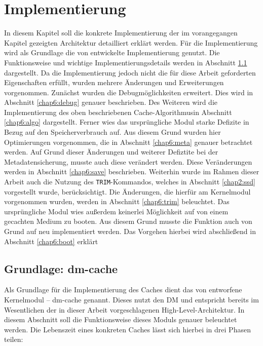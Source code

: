 \chapter{Implementierung}
\label{chap6}

In diesem Kapitel soll die konkrete Implementierung der im vorangegangen Kapitel gezeigten Architektur detailliert erklärt werden. Für die Implementierung wird
als Grundlage die von \textcite{dm-cache} entwickelte Implementierung genutzt. Die Funktionsweise und wichtige Implementierungsdetails werden in Abschnitt
\ref{chap6:dm-cache} dargestellt. Da die Implementierung jedoch nicht die für diese Arbeit geforderten Eigenschaften erfüllt, wurden mehrere Änderungen und
Erweiterungen vorgenommen. Zunächst wurden die Debugmöglichkeiten erweitert. Dies wird in Abschnitt \ref{chap6:debug} genauer beschrieben. Des Weiteren wird die
Implementierung des oben beschriebenen Cache-Algorithmusin Abschnitt \ref{chap6:algo} dargestellt. Ferner wies das ursprüngliche Modul starke Defizite in Bezug
auf den Speicherverbrauch auf. Aus diesem Grund wurden hier Optimierungen vorgenommen, die in Abschnitt \ref{chap6:meta} genauer betrachtet werden. Auf Grund
dieser Änderungen und weiterer Defiztite bei der Metadatensicherung, musste auch diese verändert werden. Diese Veränderungen werden in Abschnitt
\ref{chap6:save} beschrieben. Weiterhin wurde im Rahmen dieser Arbeit auch die Nutzung des \texttt{TRIM}-Kommandos, welches in Abschnitt \ref{chap2:ssd}
vorgestellt wurde, berücksichtigt. Die Änderungen, die hierfür am Kernelmodul vorgenommen wurden, werden in Abschnitt \ref{chap6:trim} beleuchtet. Das
ursprüngliche Modul wies außerdem keinerlei Möglichkeit auf von einem gecachten Medium zu booten. Aus diesem Grund musste die Funktion auch von Grund auf neu
implementiert werden. Das Vorgehen hierbei wird abschließend in Abschnitt \ref{chap6:boot} erklärt

\section{Grundlage: dm-cache}
\label{chap6:dm-cache}

Als Grundlage für die Implementierung des Caches dient das von \citeauthor{dm-cache} entworfene Kernelmodul -- dm-cache genannt. Dieses nutzt den
\ac{DM} und entspricht bereits im Wesentlichen der in dieser Arbeit vorgeschlagenen High-Level-Architektur. In diesem Abschnitt soll die Funktionsweise dieses
Moduls genauer beleuchtet werden. Die Lebenszeit eines konkreten Caches lässt sich hierbei in drei Phasen teilen:

